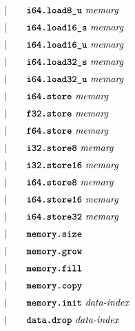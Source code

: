 \begin{alignat*}{9}
    &&       &&\quad | &\quad && \textbf{\texttt{i64.load8\textunderscore u}}\ \textit{memarg} \quad &&  \\[1mm]
    &&       &&\quad | &\quad && \textbf{\texttt{i64.load16\textunderscore s}}\ \textit{memarg} \quad &&  \\[1mm]
    &&       &&\quad | &\quad && \textbf{\texttt{i64.load16\textunderscore u}}\ \textit{memarg} \quad &&  \\[1mm]
    &&       &&\quad | &\quad && \textbf{\texttt{i64.load32\textunderscore s}}\ \textit{memarg} \quad &&  \\[1mm]
    &&       &&\quad | &\quad && \textbf{\texttt{i64.load32\textunderscore u}}\ \textit{memarg} \quad &&  \\[1mm]
    &&       &&\quad | &\quad && \textbf{\texttt{i64.store}}\ \textit{memarg} \quad &&  \\[1mm]
    &&       &&\quad | &\quad && \textbf{\texttt{f32.store}}\ \textit{memarg} \quad &&  \\[1mm]
    &&       &&\quad | &\quad && \textbf{\texttt{f64.store}}\ \textit{memarg} \quad &&  \\[1mm]
    &&       &&\quad | &\quad && \textbf{\texttt{i32.store8}}\ \textit{memarg} \quad &&  \\[1mm]
    &&       &&\quad | &\quad && \textbf{\texttt{i32.store16}}\ \textit{memarg} \quad &&  \\[1mm]
    &&       &&\quad | &\quad && \textbf{\texttt{i64.store8}}\ \textit{memarg} \quad &&  \\[1mm]
    &&       &&\quad | &\quad && \textbf{\texttt{i64.store16}}\ \textit{memarg} \quad &&  \\[1mm]
    &&       &&\quad | &\quad && \textbf{\texttt{i64.store32}}\ \textit{memarg} \quad &&  \\[1mm]
    &&       &&\quad | &\quad && \textbf{\texttt{memory.size}}\ \quad &&  \\[1mm]
    &&       &&\quad | &\quad && \textbf{\texttt{memory.grow}}\ \quad &&  \\[1mm]
    &&       &&\quad | &\quad && \textbf{\texttt{memory.fill}}\ \quad &&  \\[1mm]
    &&       &&\quad | &\quad && \textbf{\texttt{memory.copy}}\ \quad &&  \\[1mm]
    &&       &&\quad | &\quad && \textbf{\texttt{memory.init}}\ \textit{data-index} \quad &&  \\[1mm]
    &&       &&\quad | &\quad && \textbf{\texttt{data.drop}}\ \textit{data-index} \quad &&  \\[1mm]
\end{alignat*}

